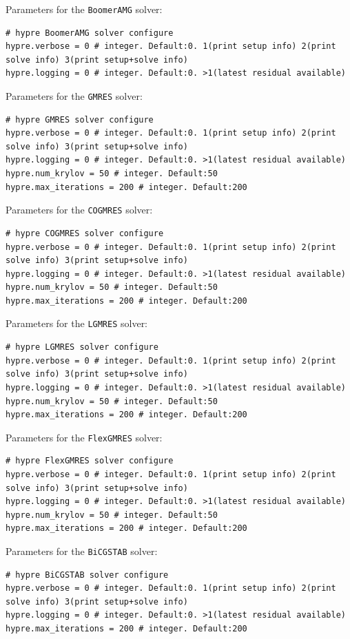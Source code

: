 \documentclass[11pt]{article}
\begin{document}
Parameters for the \verb|BoomerAMG| solver:
\begin{lstlisting}[language=pkgconfig]
# hypre BoomerAMG solver configure
hypre.verbose = 0 # integer. Default:0. 1(print setup info) 2(print solve info) 3(print setup+solve info)
hypre.logging = 0 # integer. Default:0. >1(latest residual available)
\end{lstlisting}

Parameters for the \verb|GMRES| solver:
\begin{lstlisting}[language=pkgconfig]
# hypre GMRES solver configure
hypre.verbose = 0 # integer. Default:0. 1(print setup info) 2(print solve info) 3(print setup+solve info)
hypre.logging = 0 # integer. Default:0. >1(latest residual available)
hypre.num_krylov = 50 # integer. Default:50
hypre.max_iterations = 200 # integer. Default:200
\end{lstlisting}

Parameters for the \verb|COGMRES| solver:
\begin{lstlisting}[language=pkgconfig]
# hypre COGMRES solver configure
hypre.verbose = 0 # integer. Default:0. 1(print setup info) 2(print solve info) 3(print setup+solve info)
hypre.logging = 0 # integer. Default:0. >1(latest residual available)
hypre.num_krylov = 50 # integer. Default:50
hypre.max_iterations = 200 # integer. Default:200
\end{lstlisting}

Parameters for the \verb|LGMRES| solver:
\begin{lstlisting}[language=pkgconfig]
# hypre LGMRES solver configure
hypre.verbose = 0 # integer. Default:0. 1(print setup info) 2(print solve info) 3(print setup+solve info)
hypre.logging = 0 # integer. Default:0. >1(latest residual available)
hypre.num_krylov = 50 # integer. Default:50
hypre.max_iterations = 200 # integer. Default:200
\end{lstlisting}

Parameters for the \verb|FlexGMRES| solver:
\begin{lstlisting}[language=pkgconfig]
# hypre FlexGMRES solver configure
hypre.verbose = 0 # integer. Default:0. 1(print setup info) 2(print solve info) 3(print setup+solve info)
hypre.logging = 0 # integer. Default:0. >1(latest residual available)
hypre.num_krylov = 50 # integer. Default:50
hypre.max_iterations = 200 # integer. Default:200
\end{lstlisting}

Parameters for the \verb|BiCGSTAB| solver:
\begin{lstlisting}[language=pkgconfig]
# hypre BiCGSTAB solver configure
hypre.verbose = 0 # integer. Default:0. 1(print setup info) 2(print solve info) 3(print setup+solve info)
hypre.logging = 0 # integer. Default:0. >1(latest residual available)
hypre.max_iterations = 200 # integer. Default:200
\end{lstlisting}
\end{document}
